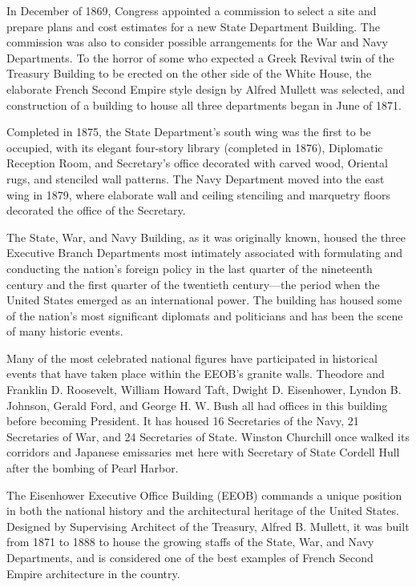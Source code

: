 \begin{listmatch}

\item 
 In December of 1869, Congress appointed a commission to select a site
and prepare plans and cost estimates for a new State Department
Building. The commission was also to consider possible arrangements for
the War and Navy Departments. To the horror of some who expected a Greek
Revival twin of the Treasury Building to be erected on the other side of
the White House, the elaborate French Second Empire style design by
Alfred Mullett was selected, and construction of a building to house all
three departments began in June of 1871.


\item 
Completed in 1875, the State Department's south wing was the first to
be occupied, with its elegant four-story library (completed in 1876),
Diplomatic Reception Room, and Secretary's office decorated with carved
wood, Oriental rugs, and stenciled wall patterns. The Navy Department
moved into the east wing in 1879, where elaborate wall and ceiling
stenciling and marquetry floors decorated the office of the Secretary.


\item 
The State, War, and Navy Building, as it was originally known, housed
the three Executive Branch Departments most intimately associated with
formulating and conducting the nation's foreign policy in the last
quarter of the nineteenth century and the first quarter of the twentieth
century---the period when the United States emerged as an international
power. The building has housed some of the nation's most significant
diplomats and politicians and has been the scene of many historic
events.


\item 
Many of the most celebrated national figures have participated in
historical events that have taken place within the EEOB's granite walls.
Theodore and Franklin D. Roosevelt, William Howard Taft, Dwight D. Eisenhower, Lyndon
B. Johnson, Gerald Ford, and George H. W. Bush all
had offices in this building before becoming President. It has housed 16
Secretaries of the Navy, 21 Secretaries of War, and 24 Secretaries of
State. Winston Churchill once walked its corridors and Japanese
emissaries met here with Secretary of State Cordell Hull after the
bombing of Pearl Harbor.


\item 
The Eisenhower Executive Office Building (EEOB) commands a unique
position in both the national history and the architectural heritage of
the United States. Designed by Supervising Architect of the Treasury,
Alfred B. Mullett, it was built from 1871 to 1888 to house the growing
staffs of the State, War, and Navy Departments, and is considered one of
the best examples of French Second Empire architecture in the country.



\end{listmatch}
